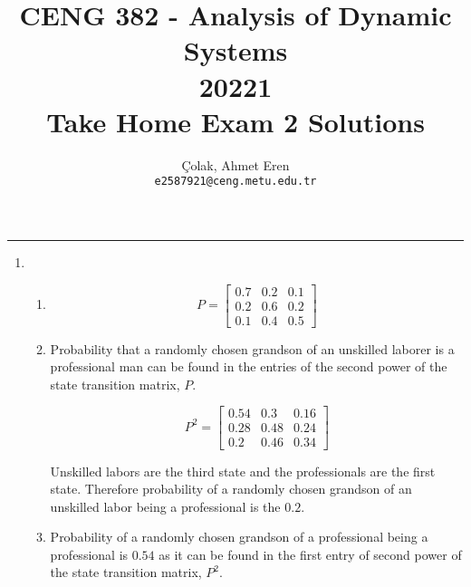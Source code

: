 \documentclass[12pt,a4paper, margin=1in]{article}
\author{
  Çolak, Ahmet Eren\\
  \texttt{e2587921@ceng.metu.edu.tr}
}
\title{CENG 382 - Analysis of Dynamic Systems \\
20221\\
Take Home Exam 2 Solutions}
\begin{document}
\maketitle

\newcommand\ddfrac[2]{\frac{\displaystyle #1}{\displaystyle #2}}

\noindent\rule{19cm}{1.2pt}

\begin{enumerate}[label=\textbf{\arabic*.}]

    \item %
        \begin{enumerate}
            \item
                \begin{equation*}
                    P = \begin{bmatrix}
                        0.7 & 0.2 & 0.1 \\
                        0.2 & 0.6 & 0.2 \\
                        0.1 & 0.4 & 0.5
                    \end{bmatrix}
                \end{equation*}
            
            \item 
                Probability that a randomly chosen grandson of an unskilled laborer is a professional man
                can be found in the entries of the second power of the state transition matrix, $P$.

                \begin{equation*}
                    P^2 = \begin{bmatrix}
                        0.54 & 0.3 & 0.16 \\
                        0.28 & 0.48 & 0.24 \\
                        0.2 & 0.46 & 0.34
                    \end{bmatrix}
                \end{equation*}

                Unskilled labors are the third state and the professionals are the first state. Therefore probability of a 
                randomly chosen grandson of an unskilled labor being a professional is the $0.2$.
            \item 
                Probability of a randomly chosen grandson of a professional being a professional 
                is $0.54$ as it can be found in the first entry of second power of the state transition matrix, $P^2$.
        

\end{enumerate}
\end{enumerate}
\end{document}
